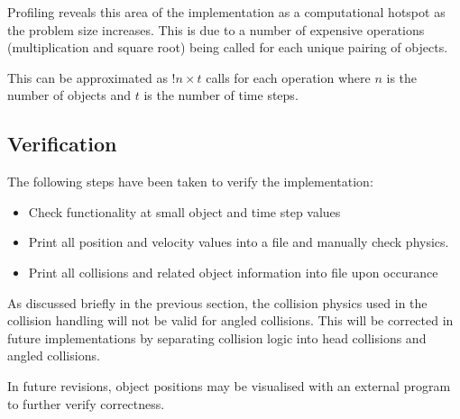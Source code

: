 \documentclass[twoside,twocolumn]{article}
\begin{document}
	Profiling reveals this area of the implementation as a  computational hotspot as the problem size increases. This is due to a number of expensive operations (multiplication and square root) being called for each unique pairing of objects.\newline
	
	This can be approximated as $!n \times t$ calls for each operation where $n$ is the number of objects and $t$ is the number of time steps.  \newline
	\subsection{Verification}
	
	The following steps have been taken to verify the implementation:
	
	\begin{itemize}
		\item Check functionality at small object and time step values
		\item Print all position and velocity values into a file and manually check physics.
		\item Print all collisions and related object information into file upon occurance
	\end{itemize}
	
	As discussed briefly in the previous section, the collision physics used in the collision handling will not be valid for angled collisions. This will be corrected in future implementations by separating collision logic into head collisions and angled collisions.\newline
	
	In future revisions, object positions may be visualised with an external program to further verify correctness.
	
	\newpage
\end{document}
